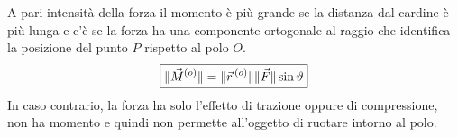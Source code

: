 \documentclass[10pt,a4paper]{book}
\DeclarePairedDelimiter{\norma}{\lVert}{\rVert} %
\begin{document}
\begin{figure}[htpb]
\end{figure}
\FloatBarrier
A pari intensità della forza il momento è più grande se la distanza dal cardine è più lunga e c'è se la forza ha una componente ortogonale al raggio che identifica la posizione del punto $P$ rispetto al polo $O$.
\[
	\boxed{\norma{\vec{M}^{(o)}}= \norma{\vec{r}\,^{(o)}} \norma{\vec{F}} \sin\vartheta}
\]
In caso contrario, la forza ha solo l'effetto di trazione oppure di compressione, non ha momento e quindi non permette all'oggetto di ruotare intorno al polo.
\end{document}
